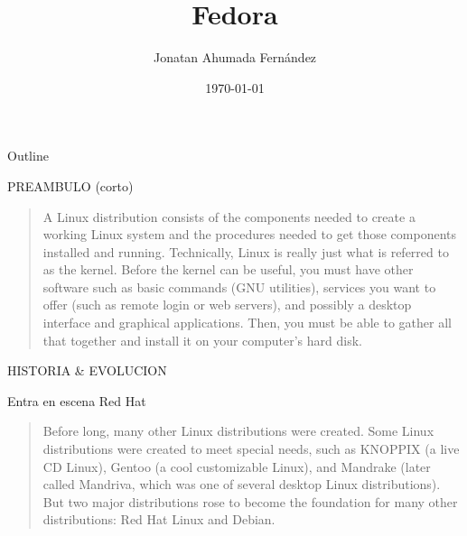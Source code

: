 \documentclass[presentation]{beamer}
\author{Jonatan Ahumada Fernández}
\date{\today}
\title{Fedora}
\begin{document}
\maketitle
\begin{frame}{Outline}
\tableofcontents
\end{frame}


\begin{frame}[label=sec-1]{PREAMBULO (corto)}
\begin{quote}
A Linux distribution consists of the components needed to create a working Linux system and the procedures needed to get those components installed and running.
 Technically, Linux is really just what is referred to as the kernel.
 Before the kernel can be useful, you must have other software such as basic commands (GNU utilities),
 services you want to offer (such as remote login or web servers), and possibly a desktop interface and graphical applications.
 Then, you must be able to gather all that together and install it on your computer’s hard disk.
\end{quote}
\end{frame}
\begin{frame}[label=sec-2]{HISTORIA \& EVOLUCION}
\begin{block}{Entra en escena Red Hat}
\begin{quote}
Before long, many other Linux distributions were created.
 Some Linux distributions were created to meet special needs, such as KNOPPIX (a live CD Linux), Gentoo (a cool customizable Linux), and Mandrake (later called Mandriva, which was one of several desktop Linux distributions).
 But two major distributions rose to become the foundation for many other distributions: Red Hat Linux and Debian.
\end{quote}
\end{block}
\end{frame}
\end{document}
